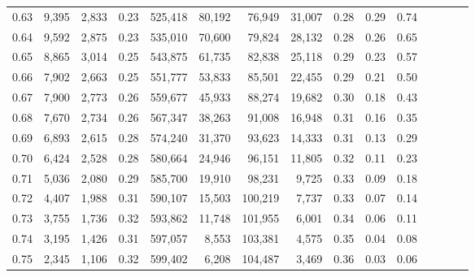 \begin{tabular}{rrrcrrrrrrrrrrr}
0.63 &   9,395 &  2,833 &                                       0.23 &  525,418 &   80,192 &   76,949 &   31,007 &  0.28 &  0.29 &                         0.74 \\
0.64 &   9,592 &  2,875 &                                       0.23 &  535,010 &   70,600 &   79,824 &   28,132 &  0.28 &  0.26 &                         0.65 \\
0.65 &   8,865 &  3,014 &                                       0.25 &  543,875 &   61,735 &   82,838 &   25,118 &  0.29 &  0.23 &                         0.57 \\
0.66 &   7,902 &  2,663 &                                       0.25 &  551,777 &   53,833 &   85,501 &   22,455 &  0.29 &  0.21 &                         0.50 \\
0.67 &   7,900 &  2,773 &                                       0.26 &  559,677 &   45,933 &   88,274 &   19,682 &  0.30 &  0.18 &                         0.43 \\
0.68 &   7,670 &  2,734 &                                       0.26 &  567,347 &   38,263 &   91,008 &   16,948 &  0.31 &  0.16 &                         0.35 \\
0.69 &   6,893 &  2,615 &                                       0.28 &  574,240 &   31,370 &   93,623 &   14,333 &  0.31 &  0.13 &                         0.29 \\
0.70 &   6,424 &  2,528 &                                       0.28 &  580,664 &   24,946 &   96,151 &   11,805 &  0.32 &  0.11 &                         0.23 \\
0.71 &   5,036 &  2,080 &                                       0.29 &  585,700 &   19,910 &   98,231 &    9,725 &  0.33 &  0.09 &                         0.18 \\
0.72 &   4,407 &  1,988 &                                       0.31 &  590,107 &   15,503 &  100,219 &    7,737 &  0.33 &  0.07 &                         0.14 \\
0.73 &   3,755 &  1,736 &                                       0.32 &  593,862 &   11,748 &  101,955 &    6,001 &  0.34 &  0.06 &                         0.11 \\
0.74 &   3,195 &  1,426 &                                       0.31 &  597,057 &    8,553 &  103,381 &    4,575 &  0.35 &  0.04 &                         0.08 \\
0.75 &   2,345 &  1,106 &                                       0.32 &  599,402 &    6,208 &  104,487 &    3,469 &  0.36 &  0.03 &                         0.06 \\

\end{tabular}
